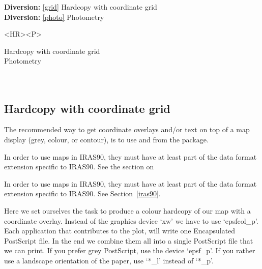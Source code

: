 \begin{latexonly}
{\bf Diversion:} \ref{grid} Hardcopy with coordinate grid\\
{\bf Diversion:} \ref{photo} Photometry\\
\end{latexonly}

\begin{htmlonly}
\begin{rawhtml} <HR><P> \end{rawhtml}
{\bf {}} Hardcopy with coordinate grid\\
{\bf {}} Photometry\\
{\bf {}}\\
{\bf {}}\\
\end{htmlonly}


\subsection{\label{grid}Hardcopy with coordinate grid}

   The recommended way to get coordinate overlays and/or text on top of
   a map display (grey, colour, or contour), is to use
{\tt {}}
   and
{\tt {}}
   from the
   package.

\begin{htmlonly}
   In order to use maps in IRAS90, they must have at least part
   of the data format extension specific to IRAS90. See the section on
\end{htmlonly}
\begin{latexonly}
   In order to use maps in IRAS90, they must have at least part
   of the data format extension specific to IRAS90. See
Section~\ref{iras90}.
\end{latexonly}

   Here we set ourselves the task to produce a colour hardcopy of our
   map with a coordinate overlay. Instead of the graphics device `xw' we
   have to use `epsfcol\_p'. Each application that contributes to the
   plot, will write one Encapsulated PostScript file. In the end we
   combine them all into a single PostScript file that we can print. If
   you prefer grey PostScript, use the device `epsf\_p'. If you rather
   use a landscape orientation of the paper, use `*\_l' instead of `*\_p'.

